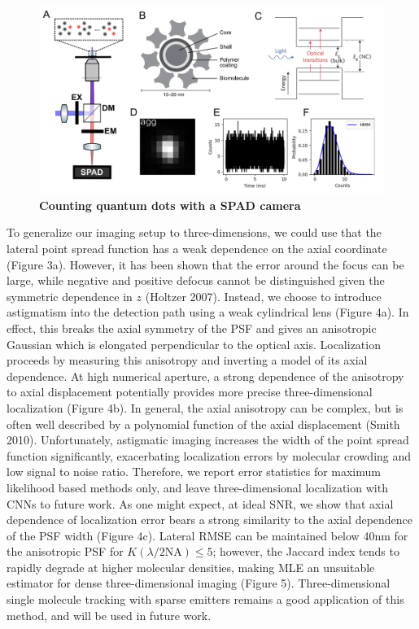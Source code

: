 \documentclass{ucetd}
\begin{document}
\begin{figure}
\begin{center}
\includegraphics[width=15cm]{QD-Counting.png}
\end{center}
\caption{\textbf{Counting quantum dots with a SPAD camera}}
\end{figure}


To generalize our imaging setup to three-dimensions, we could use that the lateral point spread function has a weak dependence on the axial coordinate (Figure 3a). However, it has been shown that the error around the focus can be large, while negative and positive defocus cannot be distinguished given the symmetric dependence in $z$ (Holtzer 2007). Instead, we choose to introduce astigmatism into the detection path using a weak cylindrical lens (Figure 4a). In effect, this breaks the axial symmetry of the PSF and gives an anisotropic Gaussian which is elongated perpendicular to the optical axis. Localization proceeds by measuring this anisotropy and inverting a model of its axial dependence. At high numerical aperture, a strong dependence of the anisotropy to axial displacement potentially provides more precise three-dimensional localization (Figure 4b). In general, the axial anisotropy can be complex, but is often well described by a polynomial function of the axial displacement (Smith 2010). Unfortunately, astigmatic imaging increases the width of the point spread function significantly, exacerbating localization errors by molecular crowding and low signal to noise ratio. Therefore, we report error statistics for maximum likelihood based methods only, and leave three-dimensional localization with CNNs to future work. As one might expect, at ideal SNR, we show that axial dependence of localization error bears a strong similarity to the axial dependence of the PSF width (Figure 4c). Lateral RMSE can be maintained below 40nm for the anisotropic PSF for $K(\lambda/2\mathrm{NA}) \leq 5$; however, the Jaccard index tends to rapidly degrade at higher molecular densities, making MLE an unsuitable estimator for dense three-dimensional imaging (Figure 5). Three-dimensional single molecule tracking with sparse emitters remains a good application of this method, and will be used in future work.
\end{document}
